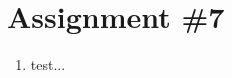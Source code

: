 \chapter{Assignment \#7}
\label{ch:ass7n}

\begin{fullwidth}
\begin{enumerate}
\item test...
\end{enumerate}
\end{fullwidth}
